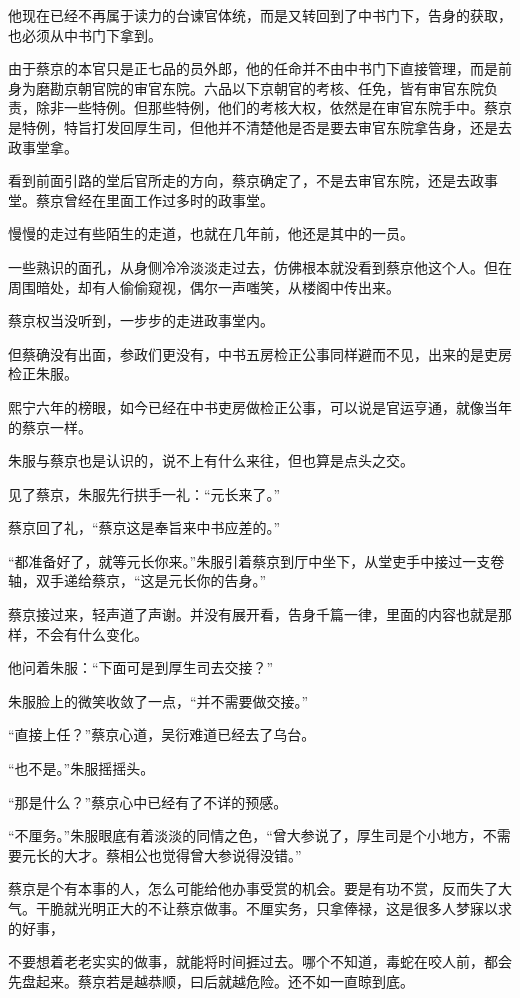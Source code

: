 他现在已经不再属于读力的台谏官体统，而是又转回到了中书门下，告身的获取，也必须从中书门下拿到。

由于蔡京的本官只是正七品的员外郎，他的任命并不由中书门下直接管理，而是前身为磨勘京朝官院的审官东院。六品以下京朝官的考核、任免，皆有审官东院负责，除非一些特例。但那些特例，他们的考核大权，依然是在审官东院手中。蔡京是特例，特旨打发回厚生司，但他并不清楚他是否是要去审官东院拿告身，还是去政事堂拿。

看到前面引路的堂后官所走的方向，蔡京确定了，不是去审官东院，还是去政事堂。蔡京曾经在里面工作过多时的政事堂。

慢慢的走过有些陌生的走道，也就在几年前，他还是其中的一员。

一些熟识的面孔，从身侧冷冷淡淡走过去，仿佛根本就没看到蔡京他这个人。但在周围暗处，却有人偷偷窥视，偶尔一声嗤笑，从楼阁中传出来。

蔡京权当没听到，一步步的走进政事堂内。

但蔡确没有出面，参政们更没有，中书五房检正公事同样避而不见，出来的是吏房检正朱服。

熙宁六年的榜眼，如今已经在中书吏房做检正公事，可以说是官运亨通，就像当年的蔡京一样。

朱服与蔡京也是认识的，说不上有什么来往，但也算是点头之交。

见了蔡京，朱服先行拱手一礼：“元长来了。”

蔡京回了礼，“蔡京这是奉旨来中书应差的。”

“都准备好了，就等元长你来。”朱服引着蔡京到厅中坐下，从堂吏手中接过一支卷轴，双手递给蔡京，“这是元长你的告身。”

蔡京接过来，轻声道了声谢。并没有展开看，告身千篇一律，里面的内容也就是那样，不会有什么变化。

他问着朱服：“下面可是到厚生司去交接？”

朱服脸上的微笑收敛了一点，“并不需要做交接。”

“直接上任？”蔡京心道，吴衍难道已经去了乌台。

“也不是。”朱服摇摇头。

“那是什么？”蔡京心中已经有了不详的预感。

“不厘务。”朱服眼底有着淡淡的同情之色，“曾大参说了，厚生司是个小地方，不需要元长的大才。蔡相公也觉得曾大参说得没错。”

蔡京是个有本事的人，怎么可能给他办事受赏的机会。要是有功不赏，反而失了大气。干脆就光明正大的不让蔡京做事。不厘实务，只拿俸禄，这是很多人梦寐以求的好事，

不要想着老老实实的做事，就能将时间捱过去。哪个不知道，毒蛇在咬人前，都会先盘起来。蔡京若是越恭顺，曰后就越危险。还不如一直晾到底。

